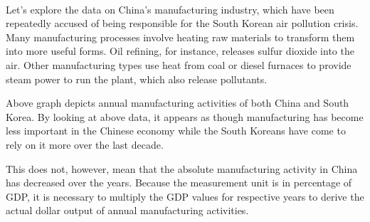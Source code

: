 \documentclass[11pt]{article}
\begin{document}
    \begin{center}
    \end{center}
    { \hspace*{\fill} \\}
    
    Let's explore the data on China's manufacturing industry, which have
been repeatedly accused of being responsible for the South Korean air
pollution crisis. Many manufacturing processes involve heating raw
materials to transform them into more useful forms. Oil refining, for
instance, releases sulfur dioxide into the air. Other manufacturing
types use heat from coal or diesel furnaces to provide steam power to
run the plant, which also release pollutants.

Above graph depicts annual manufacturing activities of both China and
South Korea. By looking at above data, it appears as though
manufacturing has become less important in the Chinese economy while the
South Koreans have come to rely on it more over the last decade.

This does not, however, mean that the absolute manufacturing activity in
China has decreased over the years. Because the measurement unit is in
percentage of GDP, it is necessary to multiply the GDP values for
respective years to derive the actual dollar output of annual
manufacturing activities.
\end{document}
